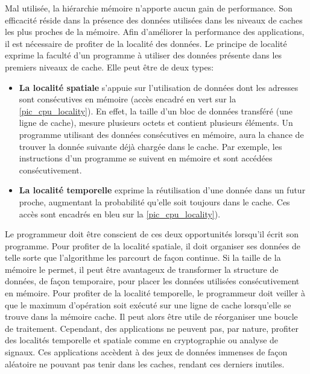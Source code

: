         Mal utilisée, la hiérarchie mémoire n'apporte aucun gain de performance. Son efficacité réside dans la présence des données utilisées dans les niveaux de caches les plus proches de la mémoire. Afin d'améliorer la performance des applications, il est nécessaire de profiter de la localité des données. Le principe de localité exprime la faculté d'un programme à utiliser des données présente dans les premiers niveaux de cache. Elle peut être de deux types:
        \begin{itemize}
            \item \textbf{La localité spatiale} s'appuie sur l'utilisation de données dont les adresses sont consécutives en mémoire (accès encadré en vert sur la \autoref{pic_cpu_locality}). En effet, la taille d'un bloc de données transféré (une ligne de cache), mesure plusieurs octets et contient plusieurs éléments. Un programme utilisant des données consécutives en mémoire, aura la chance de trouver la donnée suivante déjà chargée dans le cache.  Par exemple, les instructions d'un programme se suivent en mémoire et sont accédées consécutivement.
            \item \textbf{La localité temporelle} exprime la réutilisation d'une donnée dans un futur proche, augmentant la probabilité qu'elle soit toujours dans le cache. Ces accès sont encadrés en bleu sur la \autoref{pic_cpu_locality}).
        
        \end{itemize}
        
        Le programmeur doit être conscient de ces deux opportunités lorsqu'il écrit son programme. Pour profiter de la localité spatiale, il doit organiser ses données de telle sorte que l'algorithme les parcourt de façon continue. Si la taille de la mémoire le permet, il peut être avantageux de transformer la structure de données, de façon temporaire, pour placer les données utilisées consécutivement en mémoire. Pour profiter de la localité temporelle, le programmeur doit veiller à que le maximum d'opération soit exécuté sur une ligne de cache lorsqu'elle se trouve dans la mémoire cache. Il peut alors être utile de réorganiser une boucle de traitement. Cependant, des applications ne peuvent pas, par nature, profiter des localités temporelle et spatiale comme en cryptographie ou analyse de signaux. Ces applications accèdent à des jeux de données immenses de façon aléatoire ne pouvant pas tenir dans les caches, rendant ces derniers inutiles.
        
